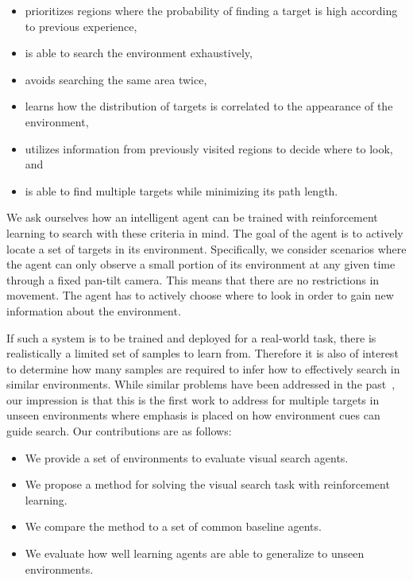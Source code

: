 \begin{itemize}
  \item prioritizes regions where the probability of finding a target is high according to previous experience,
  \item is able to search the environment exhaustively,
  \item avoids searching the same area twice,
  \item learns how the distribution of targets is correlated to the appearance of the environment,
  \item utilizes information from previously visited regions to decide where to look, and
  \item is able to find multiple targets while minimizing its path length. %
\end{itemize}

We ask ourselves how an intelligent agent can be trained with reinforcement learning to search with these criteria in mind.
The goal of the agent is to actively locate a set of targets in its environment.
Specifically, we consider scenarios where the agent can only observe a small portion of its environment at any given time through a fixed pan-tilt camera.
This means that there are no restrictions in movement.
The agent has to actively choose where to look in order to gain new information about the environment.

If such a system is to be trained and deployed for a real-world task, there is realistically a limited set of samples to learn from.
Therefore it is also of interest to determine how many samples are required to infer how to effectively search in similar environments.
While similar problems have been addressed in the past~\cite{minut_mahadevan_2001,mirowski_navigate_2017}, 
our impression is that this is the first work to address for multiple targets in unseen environments where emphasis is placed on how environment cues can guide search.
Our contributions are as follows:

\begin{itemize}
  \item We provide a set of environments to evaluate visual search agents.
  \item We propose a method for solving the visual search task with reinforcement learning.
  \item We compare the method to a set of common baseline agents.
  \item We evaluate how well learning agents are able to generalize to unseen environments.
\end{itemize}

